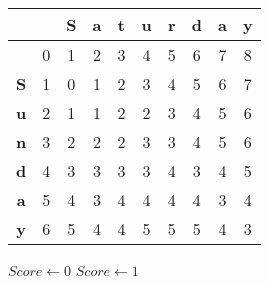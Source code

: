 \begin{frame}
    \begin{center}
\begin{tabular}{|c|c||c|c|c|c|c|c|c|c|}\hline
  &   & \textbf{S} & \textbf{a} & \textbf{t} & \textbf{u} & \textbf{r} & \textbf{d} & \textbf{a} & \textbf{y} \\\hline
  & 0 & 1 & 2 & 3 & 4 & 5 & 6 & 7 & 8 \\\hline\hline
\textbf{S} & 1 & 0 & 1 & 2 & 3 & 4 & 5 & 6 & 7 \\\hline
\textbf{u} & 2 & 1 & 1 & 2 & 2 & 3 & 4 & 5 & 6 \\\hline
\textbf{n} & 3 & 2 & 2 & 2 & 3 & 3 & 4 & 5 & 6 \\\hline
\textbf{d} & 4 & 3 & 3 & 3 & 3 & 4 & 3 & 4 & 5 \\\hline
\textbf{a} & 5 & 4 & 3 & 4 & 4 & 4 & 4 & 3 & 4 \\\hline
\textbf{y} & 6 & 5 & 4 & 4 & 5 & 5 & 5 & 4 & 3 \\\hline
    \end{tabular}
    \end{center}

\end{frame}


\begin{frame}
\small
\begin{algorithmic}[1]
     \label{block:a}
    \label{block:forbegin}
         \label{block:barrier}
        \label{block:ifscorebegin}
            \State $Score \gets 0$
        \Else
            \State $Score \gets 1$
        \EndIf\label{block:ifscoreend}
        \label{block:x}
        \label{block:d}
        \label{block:up}
        \label{block:left}
        \label{block:write}
    \EndFor\label{block:forend}
\EndProcedure
\end{algorithmic}

\end{frame}

